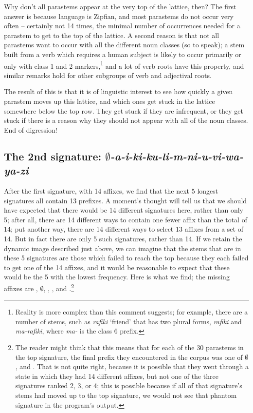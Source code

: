\documentclass[output=paper,colorlinks,citecolor=brown]{langscibook}
\begin{document}
Why don't all parastems appear at the very top of the lattice, then? The first answer is because language is Zipfian, and most parastems do not occur very often -- certainly not 14 times, the minimal number of occurrences needed for a parastem to get to the top of the lattice. A second reason is that not all parastems want to occur with all the different noun classes (so to speak); a stem built from a verb which requires a human subject is likely to occur primarily or only with class 1 and 2 markers,\footnote{Reality is more complex than this comment suggests; for example, there are a number of stems, such as \textit{rafiki} `friend' that has two plural forms, \textit{rafiki} and \textit{ma-rafiki}, where \textit{ma-} is the class 6 prefix.} and a lot of verb roots have this property, and similar remarks hold for other subgroups of verb and adjectival roots. 

The result of this is that it is of linguistic interest to see how quickly a given parastem moves up this lattice, and which ones get stuck in the lattice somewhere below the top row. They get stuck if they are infrequent, or they get stuck if there is a reason why they should not appear with all of the noun classes. End of digression!

\subsection{The 2nd signature: \textit{$\emptyset$-a-i-ki-ku-li-m-ni-u-vi-wa-ya-zi} }
 
 
 
After the first signature, with 14 affixes, we find that the next 5 longest signatures all contain 13 prefixes. A moment's thought will tell us that we should have expected that there would be 14 different signatures here, rather than only 5; after all, there are 14 different ways to contain one fewer affix than the total of 14; put another way, there are 14 different ways to select 13 affixes from a set of 14. But in fact there are only 5 such signatures, rather than 14. If we retain the dynamic image described just above, we can imagine that the stems that are in these 5 signatures are those which failed to reach the top because they each failed to get one of the 14 affixes, and it would be reasonable to expect that these would be the 5 with the lowest frequency. Here is what we find; the missing affixes are \textit{}, $\emptyset$, \textit{}, \textit{}, and \textit{}.\footnote{The reader might think that this means that for each of the 30 parastems in the top signature, the final prefix they encountered in the corpus was one of $\emptyset$, \textit{} and \textit{}. That is not quite right, because it is possible that they went through a state in which they had 14 different affixes, but not one of the three signatures ranked 2, 3, or 4; this is possible because if all of that signature's stems had moved up to the top signature, we would not see that phantom signature in the program's output.}  
  
\end{document}
